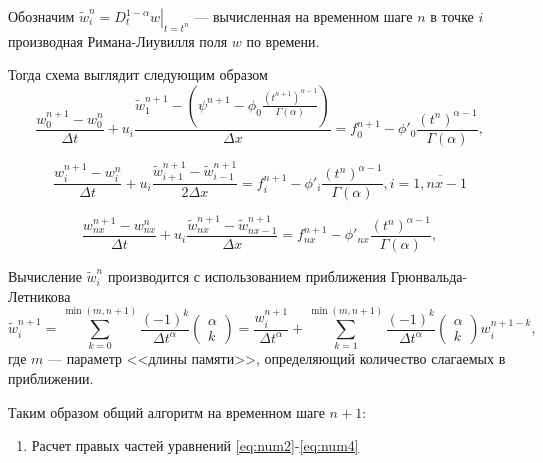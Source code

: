 Обозначим $\tilde{w}^n_i = \left.D^{1-\alpha}_t w \right|_{t=t^n}$ --- вычисленная на временном шаге $n$ в точке $i$ производная Римана-Лиувилля поля $w$ по времени.

Тогда схема выглядит следующим образом
\begin{equation}
	\label{eq:num2}
	\frac{w^{n+1}_{0} - w^{n}_{0}}{\Delta t}
	+ u_i
	\frac
		{\tilde{w}_1^{n+1} -
			\left( \psi^{n+1} - \phi_0
			\frac
				{\left(t^{n+1}\right)^{\alpha - 1}}
				{\Gamma(\alpha)}
			\right)
		}
		{\Delta x} 
	= f_0^{n+1} - \phi'_0\frac{\left(t^n\right)^{\alpha - 1}}{\Gamma(\alpha)},
\end{equation}

\begin{equation}
	\label{eq:num3}
	\frac{w^{n+1}_{i} - w^{n}_{i}}{\Delta t}
	+ u_i \frac{
		\tilde{w}^{n+1}_{i+1} -
		\tilde{w}^{n+1}_{i-1} }
	{2 \Delta x}
	= f_i^{n+1} - \phi'_{i}\frac{\left(t^n\right)^{\alpha - 1}}{\Gamma(\alpha)},
	i=\overline{1,nx-1}
\end{equation}

\begin{equation}
	\label{eq:num4}
	\frac{w^{n+1}_{nx} - w^{n}_{nx}}{\Delta t}
	+ u_i \frac{
		\tilde{w}^{n+1}_{nx} -
		\tilde{w}^{n+1}_{nx-1} }
	{\Delta x}
	= f_{nx}^{n+1} - \phi'_{nx}\frac{\left(t^n\right)^{\alpha - 1}}{\Gamma(\alpha)},
\end{equation}

Вычисление $\tilde{w}^n_i$ производится с использованием приближения Грюнвальда-Летникова
\begin{equation}
	\label{eq:num5}
	\tilde{w}^{n+1}_i
	= \sum_{k=0}^{\min (m,n+1)}
	\frac{(-1)^k}{\Delta t^\alpha} \begin{pmatrix}\alpha \\ k \end{pmatrix}
	= \frac{w^{n+1}_{i}}{\Delta t^\alpha}
	+ \sum_{k=1}^{\min (m,n+1)}
	\frac{(-1)^k}{\Delta t^\alpha} \begin{pmatrix}\alpha \\ k \end{pmatrix}
	w^{n+1-k}_{i},
\end{equation}
где $m$ --- параметр <<длины памяти>>, определяющий количество слагаемых в приближении.

Таким образом общий алгоритм на временном шаге $n+1$:

\begin{enumerate}
	\item Расчет правых частей уравнений \ref{eq:num2}-\ref{eq:num4}
\end{enumerate}